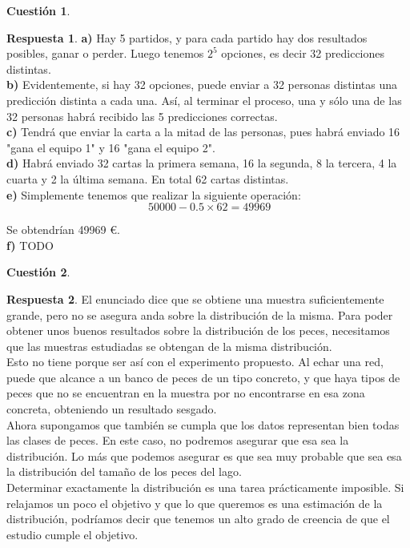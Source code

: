 \documentclass[10pt,a4paper]{article}
\theoremstyle{definition}
\newtheorem{cuestion}{Cuestión}
\newtheorem*{respuesta}{Respuesta}
\begin{document}
\begin{cuestion}
\end{cuestion}
\begin{respuesta}
\textbf{a)}
Hay 5 partidos, y para cada partido hay dos resultados posibles, ganar o perder. Luego tenemos $2^5$ opciones, es decir 32 predicciones distintas.\\

\textbf{b)}
Evidentemente, si hay 32 opciones, puede enviar a 32 personas distintas una predicción distinta a cada una. Así, al terminar el proceso, una y sólo una de las 32 personas habrá recibido las 5 predicciones correctas.\\

\textbf{c)}
Tendrá que enviar la carta a la mitad de las personas, pues habrá enviado 16 "gana el equipo 1" y 16 "gana el equipo 2".\\

\textbf{d)}
Habrá enviado 32 cartas la primera semana, 16 la segunda, 8 la tercera, 4 la cuarta y 2 la última semana. En total 62 cartas distintas.\\

\textbf{e)}
Simplemente tenemos que realizar la siguiente operación:\\

\[
\ 50000 - 0.5 \times 62 = 49969
\]

Se obtendrían 49969 \euro.\\

\textbf{f)}
TODO\\

\end{respuesta}

\begin{cuestion}
\end{cuestion}
\begin{respuesta}
El enunciado dice que se obtiene una muestra suficientemente grande, pero no se asegura anda sobre la distribución de la misma. Para poder obtener unos buenos resultados sobre la distribución de los peces, necesitamos que las muestras estudiadas se obtengan de la misma distribución.\\

Esto no tiene porque ser así con el experimento propuesto. Al echar una red, puede que alcance a un banco de peces de un tipo concreto, y que haya tipos de peces que no se encuentran en la muestra por no encontrarse en esa zona concreta, obteniendo un resultado sesgado.\\

Ahora supongamos que también se cumpla que los datos representan bien todas las clases de peces. En este caso, no podremos asegurar que esa sea la distribución. Lo más que podemos asegurar es que sea muy probable que sea esa la distribución del tamaño de los peces del lago.\\
 
Determinar exactamente la distribución es una tarea prácticamente imposible. Si relajamos un poco el objetivo y que lo que queremos es una estimación de la distribución, podríamos decir que tenemos un alto grado de creencia de que el estudio cumple el objetivo.
\end{respuesta}
\end{document}
